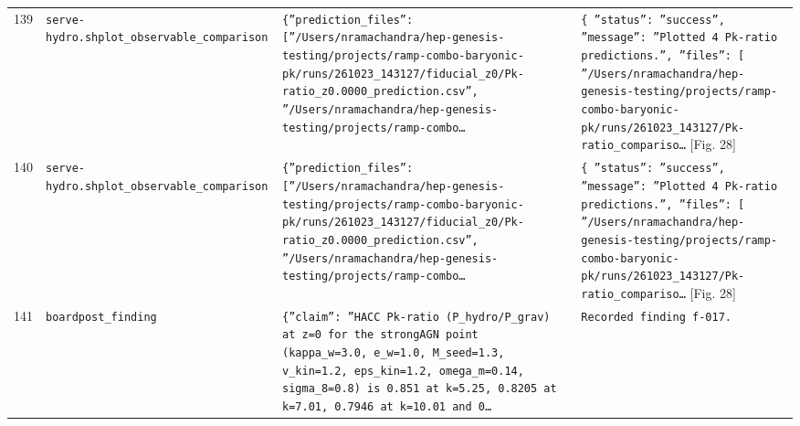 \documentclass[11pt,a4paper]{article}
\begin{document}
\begin{longtable}{@{}p{}p{}p{}p{}@{}}
139 & \texttt{serve-hydro.sh}\newline\texttt{plot\_\allowbreak{}observable\_\allowbreak{}comparison} & \texttt{\{''prediction\_\allowbreak{}files'':\allowbreak{} [''/\allowbreak{}Users/\allowbreak{}nramachandra/\allowbreak{}hep-genesis-testing/\allowbreak{}projects/\allowbreak{}ramp-combo-baryonic-pk/\allowbreak{}runs/\allowbreak{}261023\_\allowbreak{}143127/\allowbreak{}fiducial\_\allowbreak{}z0/\allowbreak{}Pk-ratio\_\allowbreak{}z0.0000\_\allowbreak{}prediction.csv'',\allowbreak{} ''/\allowbreak{}Users/\allowbreak{}nramachandra/\allowbreak{}hep-genesis-testing/\allowbreak{}projects/\allowbreak{}ramp-combo\ldots{}\allowbreak{}} & \texttt{\{   ''status'':\allowbreak{} ''success'',\allowbreak{}   ''message'':\allowbreak{} ''Plotted 4 Pk-ratio predictions.'',\allowbreak{}   ''files'':\allowbreak{} [     ''/\allowbreak{}Users/\allowbreak{}nramachandra/\allowbreak{}hep-genesis-testing/\allowbreak{}projects/\allowbreak{}ramp-combo-baryonic-pk/\allowbreak{}runs/\allowbreak{}261023\_\allowbreak{}143127/\allowbreak{}Pk-ratio\_\allowbreak{}compariso\ldots{}\allowbreak{}} [Fig. 28] \\
140 & \texttt{serve-hydro.sh}\newline\texttt{plot\_\allowbreak{}observable\_\allowbreak{}comparison} & \texttt{\{''prediction\_\allowbreak{}files'':\allowbreak{} [''/\allowbreak{}Users/\allowbreak{}nramachandra/\allowbreak{}hep-genesis-testing/\allowbreak{}projects/\allowbreak{}ramp-combo-baryonic-pk/\allowbreak{}runs/\allowbreak{}261023\_\allowbreak{}143127/\allowbreak{}fiducial\_\allowbreak{}z0/\allowbreak{}Pk-ratio\_\allowbreak{}z0.0000\_\allowbreak{}prediction.csv'',\allowbreak{} ''/\allowbreak{}Users/\allowbreak{}nramachandra/\allowbreak{}hep-genesis-testing/\allowbreak{}projects/\allowbreak{}ramp-combo\ldots{}\allowbreak{}} & \texttt{\{   ''status'':\allowbreak{} ''success'',\allowbreak{}   ''message'':\allowbreak{} ''Plotted 4 Pk-ratio predictions.'',\allowbreak{}   ''files'':\allowbreak{} [     ''/\allowbreak{}Users/\allowbreak{}nramachandra/\allowbreak{}hep-genesis-testing/\allowbreak{}projects/\allowbreak{}ramp-combo-baryonic-pk/\allowbreak{}runs/\allowbreak{}261023\_\allowbreak{}143127/\allowbreak{}Pk-ratio\_\allowbreak{}compariso\ldots{}\allowbreak{}} [Fig. 28] \\
141 & \texttt{board}\newline\texttt{post\_\allowbreak{}finding} & \texttt{\{''claim'':\allowbreak{} ''HACC Pk-ratio (P\_\allowbreak{}hydro/\allowbreak{}P\_\allowbreak{}grav)\allowbreak{} at z=\allowbreak{}0 for the strongAGN point (kappa\_\allowbreak{}w=\allowbreak{}3.0,\allowbreak{} e\_\allowbreak{}w=\allowbreak{}1.0,\allowbreak{} M\_\allowbreak{}seed=\allowbreak{}1.3,\allowbreak{} v\_\allowbreak{}kin=\allowbreak{}1.2,\allowbreak{} eps\_\allowbreak{}kin=\allowbreak{}1.2,\allowbreak{} omega\_\allowbreak{}m=\allowbreak{}0.14,\allowbreak{} sigma\_\allowbreak{}8=\allowbreak{}0.8)\allowbreak{} is 0.851 at k=\allowbreak{}5.25,\allowbreak{} 0.8205 at k=\allowbreak{}7.01,\allowbreak{} 0.7946 at k=\allowbreak{}10.01 and 0\ldots{}\allowbreak{}} & \texttt{Recorded finding f-017.} \\

\end{longtable}
\end{document}

